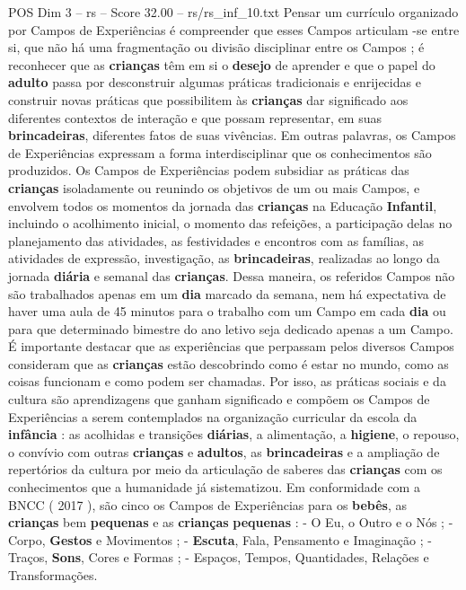 \begin{textsample}{POS Dim 3 – rs – Score 32.00 – rs/rs\_inf\_10.txt}
Pensar um currículo organizado por Campos de Experiências é compreender que esses Campos articulam -se entre si, que não há uma fragmentação ou divisão disciplinar entre os Campos ; é reconhecer que as \textbf{crianças} têm em si o \textbf{desejo} de aprender e que o papel do \textbf{adulto} passa por desconstruir algumas práticas tradicionais e enrijecidas e construir novas práticas que possibilitem às \textbf{crianças} dar significado aos diferentes contextos de interação e que possam representar, em suas \textbf{brincadeiras}, diferentes fatos de suas vivências.
Em outras palavras, os Campos de Experiências expressam a forma interdisciplinar que os conhecimentos são produzidos.
Os Campos de Experiências podem subsidiar as práticas das \textbf{crianças} isoladamente ou reunindo os objetivos de um ou mais Campos, e envolvem todos os momentos da jornada das \textbf{crianças} na Educação \textbf{Infantil}, incluindo o acolhimento inicial, o momento das refeições, a participação delas no planejamento das atividades, as festividades e encontros com as famílias, as atividades de expressão, investigação, as \textbf{brincadeiras}, realizadas ao longo da jornada \textbf{diária} e semanal das \textbf{crianças}.
Dessa maneira, os referidos Campos não são trabalhados apenas em um \textbf{dia} marcado da semana, nem há expectativa de haver uma aula de 45 minutos para o trabalho com um Campo em cada \textbf{dia} ou para que determinado bimestre do ano letivo seja dedicado apenas a um Campo.
É importante destacar que as experiências que perpassam pelos diversos Campos consideram que as \textbf{crianças} estão descobrindo como é estar no mundo, como as coisas funcionam e como podem ser chamadas.
Por isso, as práticas sociais e da cultura são aprendizagens que ganham significado e compõem os Campos de Experiências a serem contemplados na organização curricular da escola da \textbf{infância} : as acolhidas e transições \textbf{diárias}, a alimentação, a \textbf{higiene}, o repouso, o convívio com outras \textbf{crianças} e \textbf{adultos}, as \textbf{brincadeiras} e a ampliação de repertórios da cultura por meio da articulação de saberes das \textbf{crianças} com os conhecimentos que a humanidade já sistematizou.
Em conformidade com a BNCC ( 2017 ), são cinco os Campos de Experiências para os \textbf{bebês}, as \textbf{crianças} bem \textbf{pequenas} e as \textbf{crianças} \textbf{pequenas} : - O Eu, o Outro e o Nós ; - Corpo, \textbf{Gestos} e Movimentos ; - \textbf{Escuta}, Fala, Pensamento e Imaginação ; - Traços, \textbf{Sons}, Cores e Formas ; - Espaços, Tempos, Quantidades, Relações e Transformações.

\end{textsample}
